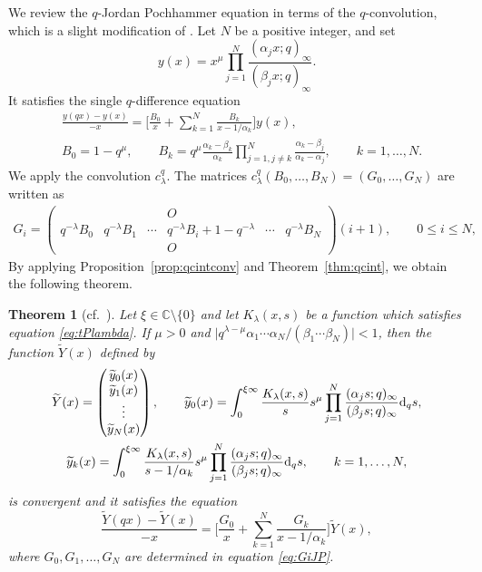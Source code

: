 \documentclass[pdftex]{sigma}
\numberwithin{equation}{section}
\newtheorem{Theorem}{Theorem}[section]
\theoremstyle{definition}
\begin{document}
We review the $q$-Jordan Pochhammer equation in terms of the $q$-convolution, which is a slight modification of \cite[Section~3.2]{AT}.
Let $N$ be a positive integer, and set
\begin{equation*}
y(x)=x^{\mu} \prod _{j=1}^N \frac{(\alpha _j x;q)_{\infty}}{(\beta _j x;q)_{\infty}}.
\end{equation*}
It satisfies the single $q$-difference equation
\begin{align}
& \frac{y(qx)-y(x)}{-x} = \Biggl[ \frac{B_0}{x} + \sum _{k=1}^N \frac{B_k}{x-1/\alpha _k} \Biggr] y(x) ,\nonumber \\
& B_{0}=1- q^{\mu}, \qquad B_k =q^{\mu} \frac{\alpha _k -\beta _k}{\alpha _k} \prod _{j=1, j\neq k}^N \frac{\alpha _k -\beta _j}{\alpha _k - \alpha _j} , \qquad k=1, \dots ,N. \label{eq:B0B1BN}
\end{align}
We apply the convolution $c^q_{\lambda }$.
The matrices $ c^q_{\lambda } (B_0,\dots, B_N) = (G_0,\dots,G_N)$ are written as
\begin{gather}
 G_i = \left(
 \begin{matrix}
 {} & {} & {} & O & {} & {} \\
 q^{-\lambda } B_0& q^{-\lambda } B_1 & \cdots & q^{-\lambda } B_i + 1 - q^{-\lambda } & \cdots & q^{-\lambda } B_N \\
 {} & {} & {} & O & {} & {}
 \end{matrix}
 \right)
 {\scriptstyle (i+1)},\! \qquad 0\leq i \leq N,\!\!\! \label{eq:GiJP}
\end{gather}
By applying Proposition~\ref{prop:qcintconv} and Theorem~\ref{thm:qcint}, we obtain the following theorem.
\begin{Theorem}[{cf.\ \cite[Theorem 3.5]{AT}}] \label{thm:qcintqJH}
Let $\xi \in \mathbb{C} \setminus \{ 0 \} $ and let $K_{\lambda}(x, s)$ be a function which satisfies equation \eqref{eq:tPlambda}.
If $\mu >0 $ and $\big| q ^{\lambda -\mu } \alpha _1 \cdots \alpha _N / (\beta _1 \cdots \beta _N)\big| < 1$, then the function $\widetilde{Y}(x) $ defined by
\begin{gather*}
 \widetilde{Y}(x) = \begin{pmatrix} \widetilde{y}_{0}(x) \\ \widetilde{y}_{1}(x) \\ \vdots \\ \widetilde{y}_{N}(x) \end{pmatrix} ,\qquad
 \widetilde{y}_{0}(x) = \int^{\xi \infty}_{0}\frac{K_{\lambda}(x, s)}{s} s^{\mu} \prod _{j=1}^N \frac{(\alpha _j s;q)_{\infty}}{(\beta _j s;q)_{\infty}} {\rm d}_{q}s,\\
 \widetilde{y}_{k}(x) = \int^{\xi \infty}_{0}\frac{K_{\lambda}(x, s)}{s-1/\alpha _k}s^{\mu}\prod _{j=1}^N \frac{(\alpha _j s;q)_{\infty}}{(\beta _j s;q)_{\infty}} {\rm d}_{q}s ,\qquad
 k=1,\dots ,N,
\end{gather*}
is convergent and it satisfies the equation
\begin{equation}
 \frac{\widetilde{Y}(qx)-\widetilde{Y}(x)}{-x} = \Biggl[ \frac{G_0}{x} + \sum _{k=1}^N \frac{G_k}{x-1/\alpha _k} \Biggr] \widetilde{Y}(x) , \label{eq:G0G1GN}
\end{equation}
where $G_0, G_1, \dots , G_N $ are determined in equation \eqref{eq:GiJP}.
\end{Theorem}
\end{document}
